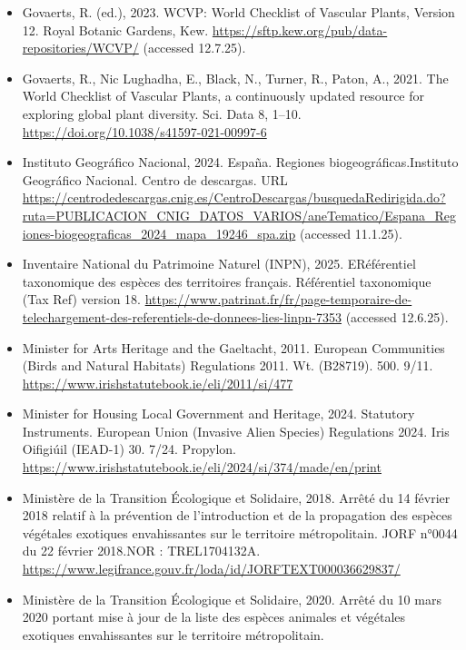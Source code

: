 \documentclass[
]{article}
\begin{document}
\begin{itemize}
  (NNSS).
  \url{https://www.nonnativespecies.org/legislation/species-of-special-concern\#List-plants}
  (accessed 12.3.25).
\item
  Govaerts, R. (ed.), 2023. WCVP: World Checklist of Vascular Plants,
  Version 12. Royal Botanic Gardens, Kew.
  \url{https://sftp.kew.org/pub/data-repositories/WCVP/} (accessed
  12.7.25).
\item
  Govaerts, R., Nic Lughadha, E., Black, N., Turner, R., Paton, A.,
  2021. The World Checklist of Vascular Plants, a continuously updated
  resource for exploring global plant diversity. Sci. Data 8, 1--10.
  \url{https://doi.org/10.1038/s41597-021-00997-6}
\item
  Instituto Geográfico Nacional, 2024. España. Regiones
  biogeográficas.Instituto Geográfico Nacional. Centro de descargas. URL
  \url{https://centrodedescargas.cnig.es/CentroDescargas/busquedaRedirigida.do?ruta=PUBLICACION_CNIG_DATOS_VARIOS/aneTematico/Espana_Regiones-biogeograficas_2024_mapa_19246_spa.zip}
  (accessed 11.1.25).
\item
  Inventaire National du Patrimoine Naturel (INPN), 2025. ERéférentiel
  taxonomique des espèces des territoires français. Référentiel
  taxonomique (Tax Ref) version 18.
  \url{https://www.patrinat.fr/fr/page-temporaire-de-telechargement-des-referentiels-de-donnees-lies-linpn-7353}
  (accessed 12.6.25).
\item
  Minister for Arts Heritage and the Gaeltacht, 2011. European
  Communities (Birds and Natural Habitats) Regulations 2011. Wt.
  (B28719). 500. 9/11.
  \url{https://www.irishstatutebook.ie/eli/2011/si/477}
\item
  Minister for Housing Local Government and Heritage, 2024. Statutory
  Instruments. European Union (Invasive Alien Species) Regulations 2024.
  Iris Oifigiúil (IEAD-1) 30. 7/24. Propylon.
  \url{https://www.irishstatutebook.ie/eli/2024/si/374/made/en/print}
\item
  Ministère de la Transition Écologique et Solidaire, 2018. Arrêté du 14
  février 2018 relatif à la prévention de l'introduction et de la
  propagation des espèces végétales exotiques envahissantes sur le
  territoire métropolitain. JORF n°0044 du 22 février 2018.NOR :
  TREL1704132A.
  \url{https://www.legifrance.gouv.fr/loda/id/JORFTEXT000036629837/}
\item
  Ministère de la Transition Écologique et Solidaire, 2020. Arrêté du 10
  mars 2020 portant mise à jour de la liste des espèces animales et
  végétales exotiques envahissantes sur le territoire métropolitain.

\end{itemize}
\end{document}

